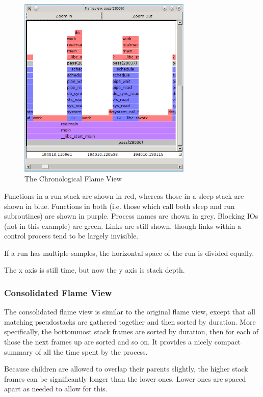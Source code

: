 \documentclass[10pt]{article}
\begin{document}
\begin{figure}[h]
\includegraphics[width=3.25in]{flameshot}
\caption{The Chronological Flame View}
\end{figure}

Functions in a run stack are shown in red, whereas those in a sleep stack are shown in blue.  Functions in both (i.e. those which call both sleep and run subroutines) are shown in purple. Process names are shown in grey.  Blocking IOs (not in this example) are green.  Links are still shown, though links within a control process tend to be largely invisible.

If a run has multiple samples, the horizontal space of the run is divided equally.

The x axis is still time, but now the y axis is stack depth.

\subsubsection{Consolidated Flame View}

The consolidated flame view is similar to the original flame view, except that all matching pseudostacks are gathered together and then sorted by duration.  More specifically, the bottommost stack frames are sorted by duration, then for each of those the next frames up are sorted and so on.  It provides a nicely compact summary of all the time spent by the process.

Because children are allowed to overlap their parents slightly, the higher stack frames can be significantly longer than the lower ones.  Lower ones are spaced apart as needed to allow for this.
\end{document}
